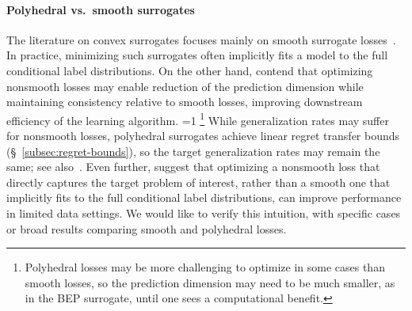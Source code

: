 \documentclass[twoside,11pt]{article}
\newcommand{\Comments}{1}
\newcommand{\CommentsR}{1}
\newcommand{\mynote}[2]{\ifnum\Comments=1\textcolor{#1}{#2}\fi}
\newcommand{\reviewerresponse}[2]{\ifnum\CommentsR=1%
  \todo[linecolor=#1!80!black,backgroundcolor=#1,bordercolor=#1!80!black]{#2}\fi}
\newcommand{\raf}[1]{\mynote{darkgreen}{[RF: #1]}}
\newcommand{\reviewertwo}[1]{\reviewerresponse{blue!20!white}{R2: #1}}
\begin{document}
\paragraph{Polyhedral vs.\ smooth surrogates}
The literature on convex surrogates focuses mainly on smooth surrogate losses~\citep{crammer2001algorithmic,bartlett2006convexity,bartlett2008classification, duchi2018multiclass, williamson2016composite, reid2010composite,menon2019multilabel,zhang2020convex,bao2020calibrated}.
In practice, minimizing such surrogates often implicitly fits a model to the full conditional label distributions.
On the other hand, \citet[Section 1.2]{ramaswamy2018consistent} contend that optimizing nonsmooth losses may enable reduction of the prediction dimension while maintaining consistency relative to smooth losses, improving downstream efficiency of the learning algorithm.%
\reviewertwo{Comment 2}
\footnote{Polyhedral losses may be more challenging to optimize in some cases than smooth losses, so the prediction dimension may need to be much smaller, as in the BEP surrogate, until one sees a computational benefit.}
While generalization rates may suffer for nonsmooth losses, polyhedral surrogates achieve linear regret transfer bounds (\S~\ref{subsec:regret-bounds}), so the target generalization rates may remain the same; see also~\citet{frongillo2021surrogate}.
Even further, \citet{lapin2016loss} suggest that optimizing a nonsmooth loss that directly captures the target problem of interest, rather than a smooth one that implicitly fits to the full conditional label distributions, can improve performance in limited data settings.
We would like to verify this intuition, with specific cases or broad results comparing smooth and polyhedral losses.
\end{document}
